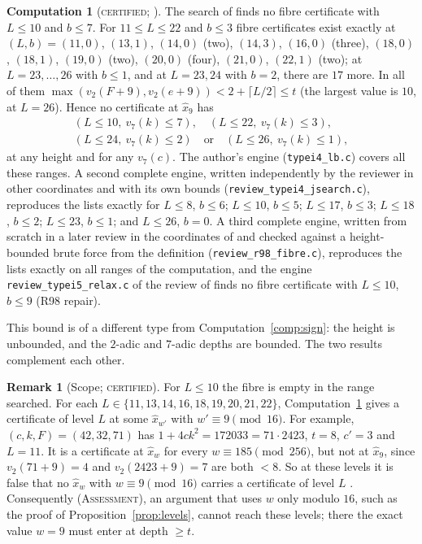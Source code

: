 \documentclass[11pt,reqno]{amsart}
\theoremstyle{definition}
\newtheorem{remark}[theorem]{Remark}
\newtheorem{computation}[theorem]{Computation}
\newcommand{\status}[1]{\textup{\textsc{#1}}}
\begin{document}
\begin{computation}[\status{certified}; {\cite[Comp.~3.4, Cor.~3.5]{PT4}}]\label{comp:anyheight}
The search of \cite[Cor.~3.2]{PT4} finds no fibre certificate with
$L\le10$ and $b\le7$.  For $11\le L\le22$ and $b\le3$ fibre certificates
exist exactly at
$(L,b)=(11,0)$, $(13,1)$, $(14,0)$ (two), $(14,3)$, $(16,0)$ (three),
$(18,0)$, $(18,1)$, $(19,0)$ (two), $(20,0)$ (four), $(21,0)$, $(22,1)$
(two); at $L=23,\dots,26$ with $b\le1$, and at $L=23,24$ with $b=2$,
there are $17$ more.  In all of them
$\max(v_2(F+9),v_2(e+9))<2+\lceil L/2\rceil\le t$ (the largest value is
$10$, at $L=26$).  Hence no
certificate at $\hat x_9$ has
\[
\begin{gathered}
(L\le10,\ v_7(k)\le7),\quad(L\le22,\ v_7(k)\le3),\\
(L\le24,\ v_7(k)\le2)\quad\text{or}\quad(L\le26,\ v_7(k)\le1),
\end{gathered}
\]
at any height and for any $v_7(c)$.  The author's engine
(\texttt{typei4\_lb.c}) covers all these ranges.  A second complete engine,
written independently by the reviewer in other coordinates and with its
own bounds (\texttt{review\_typei4\_jsearch.c}), reproduces the lists
exactly for $L\le8$, $b\le6$; $L\le10$, $b\le5$; $L\le17$, $b\le3$;
$L\le18$, $b\le2$; $L\le23$, $b\le1$; and $L\le26$, $b=0$.  A third
complete engine, written from scratch in a later review in the
coordinates of \cite[Lemma~3.1]{PT4} and checked against a
height-bounded brute force from the definition
(\texttt{review\_r98\_fibre.c}), reproduces the lists exactly on all
ranges of the computation, and the engine \texttt{review\_typei5\_relax.c}
of the review of \cite{PT5} finds no fibre certificate with $L\le10$,
$b\le9$ (R98 repair).
\end{computation}

This bound is of a different type from Computation~\ref{comp:sign}: the
height is unbounded, and the $2$-adic and $7$-adic depths are bounded.  The
two results complement each other.

\begin{remark}[Scope; \status{certified}]\label{rem:fibrescope}
For $L\le10$ the fibre is empty in the range searched.  For each
$L\in\{11,13,14,16,18,19,20,21,22\}$, Computation~\ref{comp:anyheight}
gives a certificate of level $L$ at some $\hat x_{w'}$ with
$w'\equiv9\pmod{16}$.  For example, $(c,k,F)=(42,32,71)$ has
$1+4ck^2=172033=71\cdot2423$, $t=8$, $c'=3$ and $L=11$.  It is a
certificate at $\hat x_w$ for every $w\equiv185\pmod{256}$, but not at
$\hat x_9$, since $v_2(71+9)=4$ and $v_2(2423+9)=7$ are both $<8$.  So at these
levels it is false that no $\hat x_w$ with $w\equiv9\pmod{16}$ carries a
certificate of level $L$ \cite[Prop.~4.1]{PT4}.
Consequently (\status{Assessment}), an argument that uses $w$ only modulo
$16$, such as the proof of Proposition~\ref{prop:levels}, cannot reach
these levels; there the exact value $w=9$ must enter at depth $\ge t$.
\end{remark}
\end{document}
